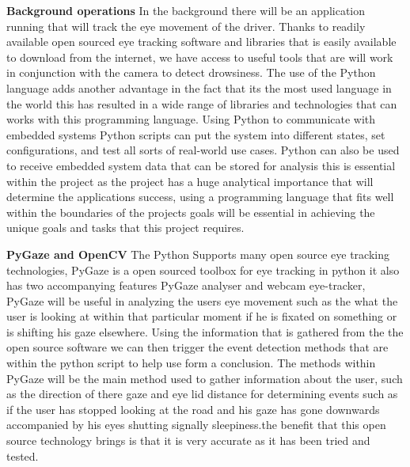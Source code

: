 \textbf{Background operations}
In the background there will be an application running that will track the eye movement of the driver. Thanks to readily available open sourced eye tracking software and libraries that is easily available to download from the internet, we have access to useful tools that are will work in conjunction with the camera to detect drowsiness. The use of the Python language adds another advantage in the fact that its the most used language in the world this has resulted in a wide range of libraries and technologies that can works with this programming language.  Using Python to communicate with embedded systems
Python scripts can put the system into different states, set configurations, and test all sorts of real-world use cases. Python can also be used to receive embedded system data that can be stored for analysis this is essential within the project as the project has a huge analytical importance that will determine the applications success, using a programming language that fits well within the boundaries of the projects goals will be essential in achieving the unique goals and tasks that this project requires. 

\textbf{PyGaze and OpenCV}
The Python Supports many open source eye tracking technologies, PyGaze is a open sourced toolbox for eye tracking in python it also has two accompanying features  PyGaze analyser and webcam eye-tracker, PyGaze will be useful in analyzing the users eye movement such as the what the user is looking at within that particular moment if he is fixated on something or is shifting his gaze elsewhere. Using the information that is gathered from the the open source software we can then trigger the event detection methods that are within the python script to help use form a conclusion. The methods within PyGaze will be the main method used to gather information about the user, such as the direction of there gaze and eye lid distance for determining events such as if the user has stopped looking at the road and his gaze has gone downwards accompanied by his eyes shutting signally sleepiness.the benefit that this open source technology brings is that it is very accurate as it has been tried and tested. 

